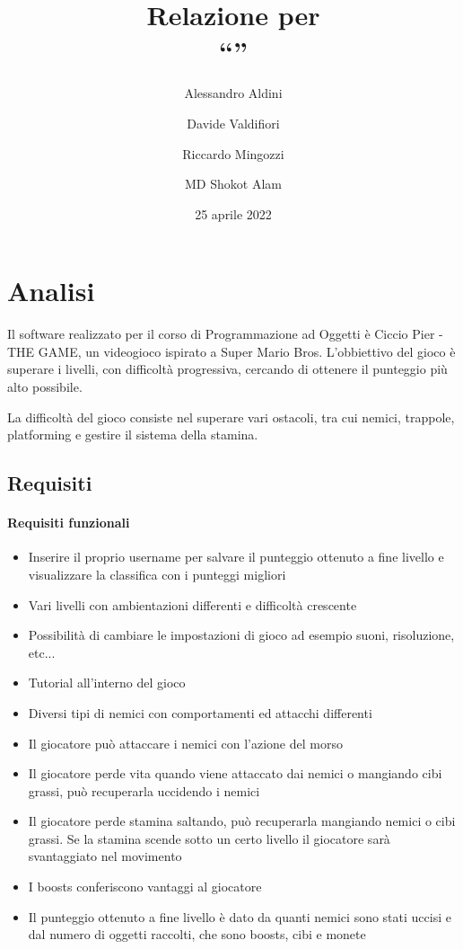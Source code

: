\documentclass[a4paper,12pt]{report}
\title{Relazione per\\``\gametitle''}
\author{
  Alessandro Aldini
  \and
  Davide Valdifiori
  \and
  Riccardo Mingozzi
  \and
  MD Shokot Alam
}
\date{25 aprile 2022}
\newcommand{\gametitle}{Ciccio Pier - THE GAME}
\begin{document}
\maketitle

\tableofcontents

\chapter{Analisi}

Il software realizzato per il corso di Programmazione ad Oggetti è \gametitle, un videogioco ispirato a Super Mario Bros. L'obbiettivo del gioco è superare i livelli, con difficoltà progressiva, cercando di ottenere il punteggio più alto possibile.

La difficoltà del gioco consiste nel superare vari ostacoli, tra cui nemici, trappole, platforming e gestire il sistema della stamina.

\section{Requisiti}

\subsubsection{Requisiti funzionali}
\begin{itemize}
	\item Inserire il proprio username per salvare il punteggio ottenuto a fine livello e visualizzare la classifica con i punteggi migliori
	\item Vari livelli con ambientazioni differenti e difficoltà crescente
	\item Possibilità di cambiare le impostazioni di gioco ad esempio suoni, risoluzione, etc...
	\item Tutorial all'interno del gioco
	\item Diversi tipi di nemici con comportamenti ed attacchi differenti
	\item Il giocatore può attaccare i nemici con l'azione del morso
	\item Il giocatore perde vita quando viene attaccato dai nemici o mangiando cibi grassi, può recuperarla uccidendo i nemici
	\item Il giocatore perde stamina saltando, può recuperarla mangiando nemici o cibi grassi. Se la stamina scende sotto un certo livello il giocatore sarà svantaggiato nel movimento
	\item I boosts conferiscono vantaggi al giocatore
	\item Il punteggio ottenuto a fine livello è dato da quanti nemici sono stati uccisi e dal numero di oggetti raccolti, che sono boosts, cibi e monete
\end{itemize}
\end{document}
